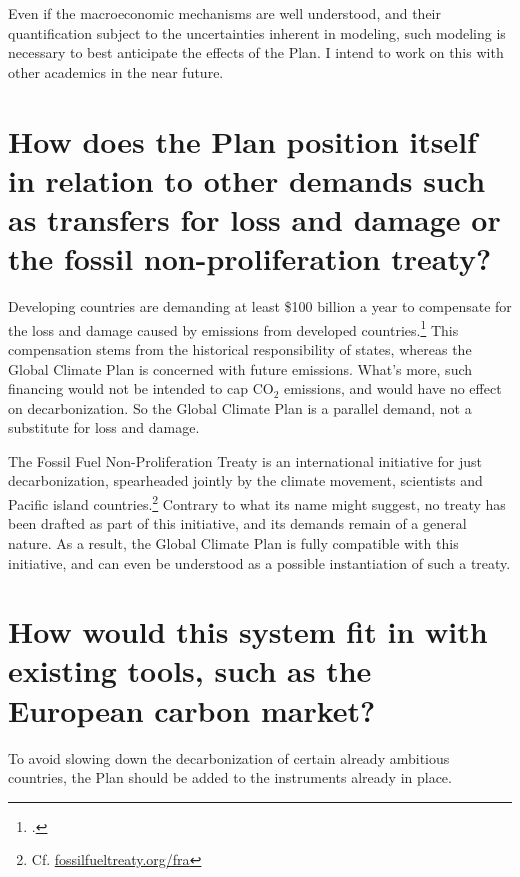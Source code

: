 \documentclass[a5paper,english,openany]{memoir}
\begin{document}
Even if the macroeconomic mechanisms are well understood, and their quantification subject to the uncertainties inherent in modeling, %
such modeling %
is necessary to best anticipate the effects of the Plan. I intend to work on this with other academics in the near future.





\section*{\normalsize How does the Plan position itself in relation to other demands such as transfers for loss and damage or the fossil non-proliferation treaty?}\label{q:climate_movt}

Developing countries are demanding at least \$100 billion a year to compensate for the loss and damage caused by emissions from developed countries.\footnote{\citet{tc_proposal_2023}.} This compensation stems from the historical responsibility of states, whereas the Global Climate Plan is concerned with future emissions. What's more, such financing would not be intended to cap CO$_\text{2}$ emissions, and would have no effect on decarbonization. %
So the Global Climate Plan is a parallel demand, not a substitute for loss and damage.

The Fossil Fuel Non-Proliferation Treaty is an international initiative for just decarbonization, %
spearheaded jointly by the climate movement, scientists and Pacific island countries.\footnote{Cf. \href{https://fossilfueltreaty.org/fra}{fossilfueltreaty.org/fra}} Contrary to what its name might suggest, no treaty has been drafted as part of this initiative, and its demands remain of a general nature. As a result, the Global Climate Plan is fully compatible with this initiative, and can even be understood as a possible instantiation of such a treaty.

\section*{\normalsize How would this system fit in with existing tools, such as the European carbon market?}\label{q:ets}

To avoid slowing down the decarbonization %
of certain already ambitious countries, the Plan should be added to the instruments already in place. 
\end{document}
